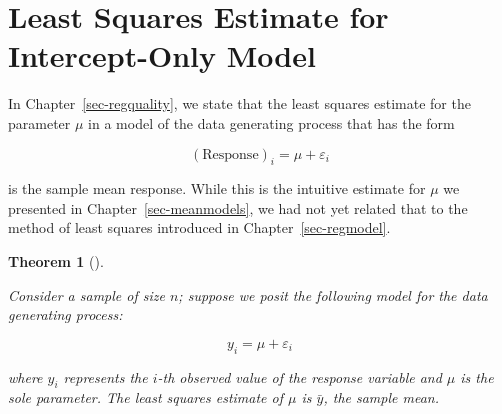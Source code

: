 \documentclass[
  letterpaper,
  DIV=11,
  numbers=noendperiod]{scrreprt}
\theoremstyle{plain}
\newtheorem{theorem}{Theorem}[chapter]
\theoremstyle{definition}
\theoremstyle{definition}
\theoremstyle{remark}
\begin{document}
\section{Least Squares Estimate for Intercept-Only
Model}\label{least-squares-estimate-for-intercept-only-model}

In Chapter~\ref{sec-regquality}, we state that the least squares
estimate for the parameter \(\mu\) in a model of the data generating
process that has the form

\[(\text{Response})_i = \mu + \varepsilon_i\]

is the sample mean response. While this is the intuitive estimate for
\(\mu\) we presented in Chapter~\ref{sec-meanmodels}, we had not yet
related that to the method of least squares introduced in
Chapter~\ref{sec-regmodel}.

\begin{theorem}[]\protect\hypertarget{thm-app-teststat-ls-one}{}\label{thm-app-teststat-ls-one}

Consider a sample of size \(n\); suppose we posit the following model
for the data generating process:

\[y_i = \mu + \varepsilon_i\]

where \(y_i\) represents the \(i\)-th observed value of the response
variable and \(\mu\) is the sole parameter. The least squares estimate
of \(\mu\) is \(\bar{y}\), the sample mean.

\end{theorem}
\end{document}
